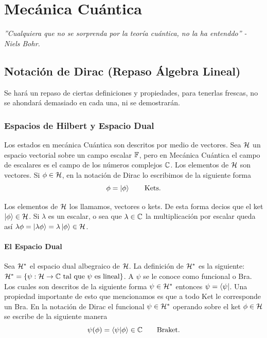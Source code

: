 
\part{Mecánica Cuántica}

\vspace*{\fill}

\begin{center}
	\textit{''Cualquiera que no se sorprenda por la teoría cuántica, no la ha entenddo'' - Niels Bohr.}
\end{center}

\vspace*{\fill}


\chapter{Notación de Dirac (Repaso Álgebra Lineal)}

Se hará un repaso de ciertas definiciones y propiedades, para tenerlas frescas, no se ahondará demasiado en cada una, ni se demostrarán. \\


\section{Espacios de Hilbert y Espacio Dual}
Los estados en mecánica Cuántica son descritos por medio de vectores. Sea $\mathcal{H}$ un espacio vectorial sobre un campo escalar $\mathbb{F}$, pero en Mecánica Cuántica el campo de escalares es el campo de los números complejos $\mathbb{C}$. Los elementos de $\mathcal{H}$ son vectores. Si $\phi \in \mathcal{H}$, en la notación de Dirac lo escribimos de la siguiente forma
	$$ \phi = \ket{\phi} \qquad \text{Kets}. $$
	
Los elementos de $\mathcal{H}$ los llamamos, vectores o kets. De esta forma decios que el ket $\ket{\phi} \in \mathcal{H}$. Si $\lambda$ es un escalar, o sea que $\lambda \in \mathbb{C}$ la multiplicación por escalar queda así $\lambda \phi = \ket{\lambda \phi} = \lambda \ket{\phi} \in \mathcal{H}$.

\subsection{El Espacio Dual}
Sea $\mathcal{H} ^*$ el espacio dual albegraico de $\mathcal{H}$. La definición de $\mathcal{H} ^*$ es la siguiente: $\mathcal{H} ^* = \{ \psi : \mathcal{H} \to \mathbb{C} \text{ tal que } \psi \text{ es lineal} \}$. A $\psi$ se le conoce como funcional o Bra. Los cuales son descritos de la siguiente forma $\psi \in \mathcal{H} ^*$ entonces $\psi = \bra{\psi}$. Una propiedad importante de esto que mencionamos es que a todo Ket le corresponde un Bra. En la notación de Dirac el funcional $\psi \in \mathcal{H} ^*$ operando sobre el ket $\phi \in \mathcal{H}$ se escribe de la siguiente manera
	$$ \psi (\phi) = \braket{\psi}{\phi} \in \mathbb{C} \qquad \text{Braket}. $$

